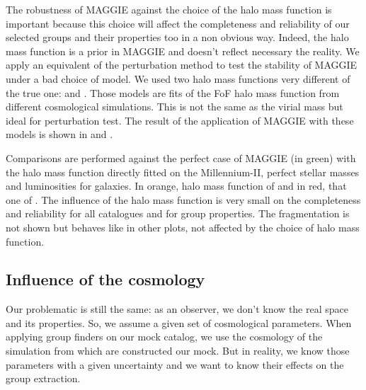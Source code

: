 The robustness of MAGGIE against the choice of the halo mass function is
important because this choice will affect the completeness and reliability of
our selected groups and their properties too in a non obvious way. Indeed, the
halo mass function is a prior in MAGGIE and doesn't reflect necessary the
reality. We apply an equivalent of the perturbation method to test the
stability of MAGGIE under a bad choice of model. We used two halo mass
functions very different of the true one: \citet{Warren+06} and
\citet{Courtin+11}. Those models are fits of the FoF halo mass function from
different cosmological simulations. This is not the same as the virial mass but
ideal for perturbation test. The result of the application of MAGGIE with these
models is shown in  and .

Comparisons are performed against the perfect case of MAGGIE (in green) with
the halo mass function directly fitted on the Millennium-II, perfect stellar
masses and luminosities for galaxies. In orange, halo mass function of
\citet{Warren+06} and in red, that one of \citet{Courtin+11}. The influence of
the halo mass function is very small on the completeness and reliability for
all catalogues and for group properties. The fragmentation is not shown but
behaves like in other plots, not affected by the choice of halo mass function.

\subsection{Influence of the cosmology}

Our problematic is still the same: as an observer, we don't know the real space
and its properties. So, we assume a given set of cosmological parameters. When
applying group finders on our mock catalog, we use the cosmology of the
simulation from which are constructed our mock. But in reality, we know those
parameters with a given uncertainty and we want to know their effects on the
group extraction.

